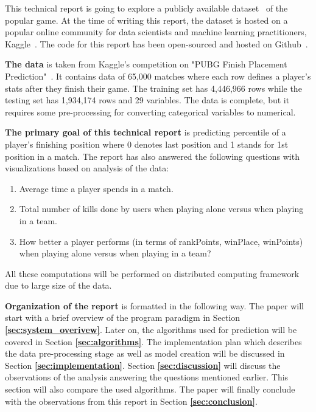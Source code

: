 \documentclass[journal,twoside,web]{ieeecolor}
\begin{document}
This technical report is going to explore a publicly available dataset~\cite{noauthor_pubg_nodate} of the popular game. At the time of writing this report, the dataset is hosted on a popular online community for data scientists and machine learning practitioners, Kaggle~\cite{noauthor_kaggle_nodate}. The code for this report has been open-sourced and hosted on Github~\cite{khan_faisal3325/pubg_prediction_2020}.

\textbf{The data} is taken from Kaggle's competition on "PUBG Finish Placement Prediction"~\cite{noauthor_pubg_nodate}. It contains data of 65,000 matches where each row defines a player's stats after they finish their game. The training set has 4,446,966 rows while the testing set has 1,934,174 rows and 29 variables. The data is complete, but it requires some pre-processing for converting categorical variables to numerical.

\textbf{The primary goal of this technical report} is predicting percentile of a player's finishing position where 0 denotes last position and 1 stands for 1st position in a match. The report has also answered the following questions with visualizations based on analysis of the data:
\begin{enumerate}
    \item Average time a player spends in a match.
    \item Total number of kills done by users when playing alone versus when playing in a team.
    \item How better a player performs (in terms of rankPoints, winPlace, winPoints) when playing alone versus when playing in a team?
\end{enumerate}
All these computations will be performed on distributed computing framework due to large size of the data.

\textbf{Organization of the report} is formatted in the following way. The paper will start with a brief overview of the program paradigm in Section \textbf{\ref{sec:system_overivew}}. Later on, the algorithms used for prediction will be covered in Section \textbf{\ref{sec:algorithms}}. The implementation plan which describes the data pre-processing stage as well as model creation will be discussed in Section \textbf{\ref{sec:implementation}}. Section \textbf{\ref{sec:discussion}} will discuss the observations of the analysis answering the questions mentioned earlier. This section will also compare the used algorithms. The paper will finally conclude with the observations from this report in Section \textbf{\ref{sec:conclusion}}.
\end{document}
